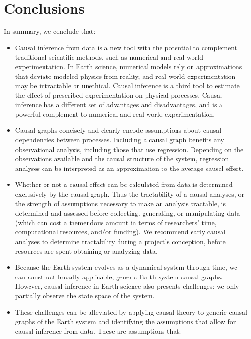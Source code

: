 \documentclass[12pt]{article}
\begin{document}
\section{Conclusions}

In summary, we conclude that:

\begin{itemize}
\item Causal inference from data is a new tool with the potential to
  complement traditional scientific methods, such as numerical and
  real world experimentation. In Earth science, numerical models rely
  on approximations that deviate modeled physics from reality, and
  real world experimentation may be intractable or unethical. Causal
  inference is a third tool to estimate the effect of prescribed
  experimentation on physical processes. Causal inference has a
  different set of advantages and disadvantages, and is a powerful
  complement to numerical and real world experimentation.
\item Causal graphs concisely and clearly encode assumptions about
  causal dependencies between processes. Including a causal graph
  benefits any observational analysis, including those that use
  regression. Depending on the observations available and the causal
  structure of the system, regression analyses can be interpreted as
  an approximation to the average causal effect.
\item Whether or not a causal effect can be calculated from data is
  determined exclusively by the causal graph. Thus the tractability of
  a causal analyses, or the strength of assumptions necessary to make
  an analysis tractable, is determined and assessed before collecting,
  generating, or manipulating data (which can cost a tremendous amount
  in terms of researchers' time, computational resources, and/or
  funding). We recommend early causal analyses to determine
  tractability during a project's conception, before resources are
  spent obtaining or analyzing data.
\item Because the Earth system evolves as a dynamical system through
  time, we can construct broadly applicable, generic Earth system
  causal graphs. However, causal inference in Earth science also
  presents challenges: we only partially observe the state space of
  the system.
\item These challenges can be alleviated by applying causal theory to
  generic causal graphs of the Earth system and identifying the
  assumptions that allow for causal inference from data. These are
  assumptions that:

\end{itemize}
\end{document}
